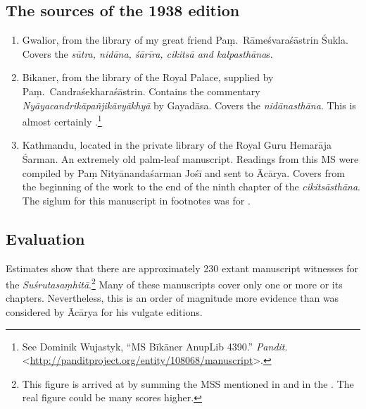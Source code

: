 %
\subsection{The sources of the 1938 edition}
\begin{enumerate}
    \item [1]  Gwalior, from the library of my great friend Paṃ.\ Rāmeśvaraśāstrin 
    Śukla. 
    Covers the \emph{sūtra, nidāna, śārīra, cikitsā and kalpasthāna}s.
    
    \item[2] Bikaner, from the library of the Royal Palace, supplied by Paṃ.\ 
    Candraśekharaśāstrin. Contains the commentary 
    \emph{Nyāyacandrikāpañjikāvyākhyā} by Gayadāsa.  Covers the 
    \emph{nidānasthāna}.      
    This is almost certainly .\footnote{See Dominik Wujastyk, “MS Bīkāner AnupLib 4390.” 
    \emph{Pandit}. 
    <\url{http://panditproject.org/entity/108068/manuscript}>.}
    
    \item [3] Kathmandu, located in the private library of the Royal Guru Hemarāja 
    Śarman.  An extremely old palm-leaf manuscript. Readings from this MS were 
    compiled by Paṃ Nityānandaśarman Jośī and sent to Ācārya. Covers from the 
    beginning of the work to the end of the ninth chapter of the 
    \emph{cikitsāsthāna}.  The 
    siglum for this manuscript in footnotes was  for 
    . 
\end{enumerate}
\subsection{Evaluation}

Estimates show that there are approximately 230 extant manuscript
witnesses for the \emph{Suśrutasaṃhitā}.\footnote{This figure is arrived
at by summing the MSS mentioned in \cite{ncc} and in the \cite{ngmcp}. The
real figure could be many scores higher.}  Many of these manuscripts cover only
one or more or its chapters.  Nevertheless, this is an order of magnitude
more evidence than was considered by Ācārya for his vulgate editions.


